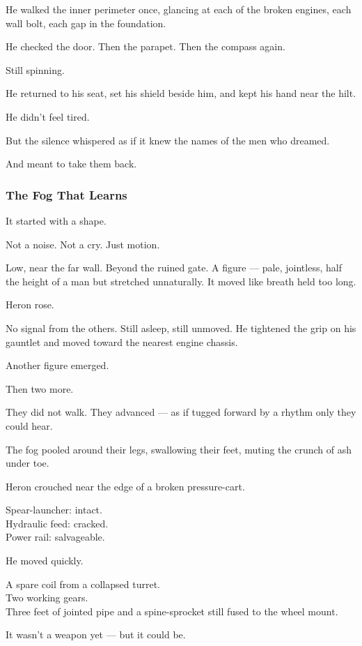 \documentclass[12pt]{article}
\begin{document}
He walked the inner perimeter once, glancing at each of the broken engines, each wall bolt, each gap in the foundation.

He checked the door. Then the parapet. Then the compass again.

Still spinning.

He returned to his seat, set his shield beside him, and kept his hand near the hilt.

He didn’t feel tired.

But the silence whispered as if it knew the names of the men who dreamed.

And meant to take them back.

\dotfill

\subsubsection*{The Fog That Learns}

It started with a shape.

Not a noise. Not a cry. Just motion.

Low, near the far wall. Beyond the ruined gate. A figure — pale, jointless, half the height of a man but stretched unnaturally. It moved like breath held too long.

Heron rose.

No signal from the others. Still asleep, still unmoved. He tightened the grip on his gauntlet and moved toward the nearest engine chassis.

Another figure emerged.

Then two more.

They did not walk. They advanced — as if tugged forward by a rhythm only they could hear.

The fog pooled around their legs, swallowing their feet, muting the crunch of ash under toe.

Heron crouched near the edge of a broken pressure-cart.

Spear-launcher: intact. \\
Hydraulic feed: cracked. \\
Power rail: salvageable.

He moved quickly.

A spare coil from a collapsed turret. \\
Two working gears. \\
Three feet of jointed pipe and a spine-sprocket still fused to the wheel mount.

It wasn’t a weapon yet — but it could be.
\end{document}
